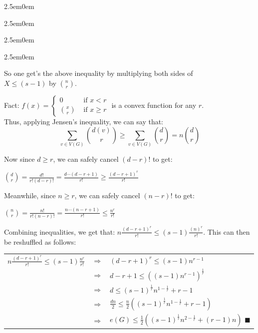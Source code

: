 \documentclass{book}
\newenvironment{myIndent}{%
   \begin{adjustwidth}{2.5em}{0em}%
}{%
   \end{adjustwidth}%
}
\newcommand{\retTwo}{\hfill\bigbreak}
\begin{document}
{\begin{myIndent}
{\begin{myIndent}
{\begin{myIndent}
\begin{myIndent}
            So one get's the above inequality by multiplying both sides of\\ $X \leq (s-1)$ by $\binom{n}{r}$. \retTwo
         \end{myIndent}
      \end{myIndent}}

      Fact: $f(x) = \left\{
      \begin{matrix}
         0 & \text{ if } x < r \\
         \binom{x}{r} & \text{ if } x \geq r
      \end{matrix}\right.$ is a convex function for any $r$. \\

      Thus, applying Jensen's inequality, we can say that:
      \[\sum\limits_{v \in V(G)}{\binom{d(v)}{r}} \geq \sum\limits_{v \in V(G)}{\binom{d}{r}} = n\binom{d}{r}\]

      \newpage

      Now since $d \geq r$, we can safely cancel $(d-r)!$ to get:

      {\center ${\displaystyle \binom{d}{r} = \frac{d!}{r!(d-r)!} = \frac{d\cdots(d-r+1)}{r!} \geq \frac{(d-r+1)^r}{r!}} $ \retTwo\par}

      Meanwhile, since $n \geq r$, we can safely cancel $(n-r)!$ to get:

      {\center ${\displaystyle \binom{n}{r} = \frac{n!}{r!(n-r)!} = \frac{n\cdots(n-r+1)}{r!} \leq \frac{n^r}{r!}} $ \retTwo\par}

      Combining inequalities, we get that: $n\frac{(d-r+1)^r}{r!} \leq (s-1)\frac{(n)^r}{r!}$. This can then be reshuffled as follows: \\ [-6pt]

      \begin{center}
         \begin{tabular}{ r c l }
            $n\frac{(d-r+1)^r}{r!} \leq (s-1)\frac{n^r}{r!}$ & $\Longrightarrow$ &
            $(d-r+1)^r \leq (s-1)n^{r-1}$ \\ [3pt]
            & $\Longrightarrow$ &
            $d-r+1 \leq \left((s-1)n^{r-1}\right)^\frac{1}{r}$ \\ [3pt]
            & $\Longrightarrow$ &
            $d \leq (s-1)^\frac{1}{r}n^{1-\frac{1}{r}} + r - 1$ \\ [3pt]
            & $\Longrightarrow$ &
            $\frac{dn}{2} \leq \frac{n}{2}\left((s-1)^\frac{1}{r}n^{1-\frac{1}{r}} + r - 1\right)$ \\ [3pt]
            & $\Longrightarrow$ &
            $e(G) \leq \frac{1}{2}\left((s-1)^\frac{1}{r}n^{2-\frac{1}{r}} + (r - 1)n\right)$ $\blacksquare$
         \end{tabular}
      \end{center}
   \end{myIndent}}
   \retTwo
\end{myIndent}}
\end{document}
